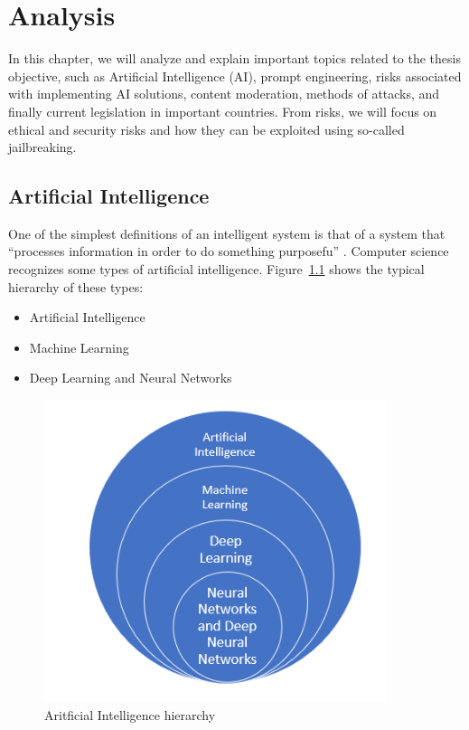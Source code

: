 \chapter{Analysis}

In this chapter, we will analyze and explain important topics related to the thesis objective, such as Artificial Intelligence (AI), prompt engineering, risks associated with implementing AI solutions, content moderation, methods of attacks, and finally current legislation in important countries. From risks, we will focus on ethical and security risks and how they can be exploited using so-called jailbreaking.

\section{Artificial Intelligence}
One of the simplest definitions of an intelligent system is that of a system
that ``processes information in order to do something purposefu'' \cite{Dignum_2019}.
Computer science recognizes some types of artificial intelligence. Figure~\ref{fig:AI-ML-DL-NN} shows the typical hierarchy of these types:

\begin{itemize}
    \item Artificial Intelligence
    \item Machine Learning
    \item Deep Learning and Neural Networks
\end{itemize}

\begin{figure}[htpb]
\begin{centering}
\includegraphics[width=10cm]{./assets/images/final deep learning.png}
\par\end{centering}
\caption{Aritficial Intelligence hierarchy \cite{ai_hierarchy_pic}
\label{fig:AI-ML-DL-NN}}
\end{figure}

